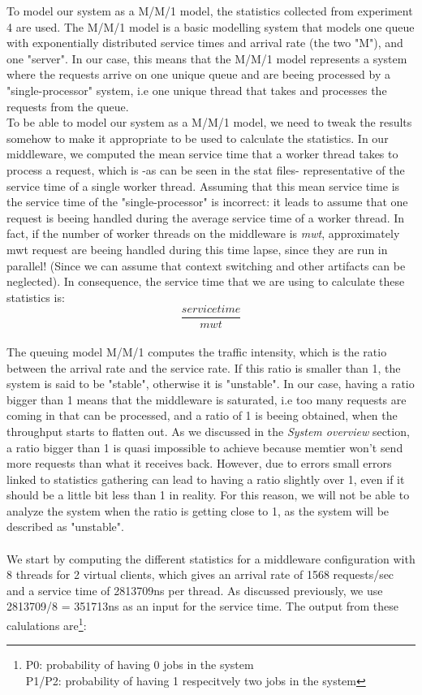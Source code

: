 \documentclass[11pt,a4paper]{article}
\begin{document}
To model our system as a M/M/1 model, the statistics collected from experiment 4 are used. 
The M/M/1 model is a basic modelling system that models one queue with exponentially distributed  service times and arrival rate (the two "M"), and one "server". In our case, this means that the M/M/1 model represents a system where the requests arrive on one unique queue and are beeing processed by a "single-processor" system, i.e one unique thread that takes and processes the requests from the queue.
\\
To be able to model our system as a M/M/1 model, we need to tweak the results somehow to make it appropriate to be used to calculate the statistics. In our middleware, we computed the mean service time that a worker thread takes to process a request, which is -as can be seen in the stat files- representative of the service time of a single worker thread. Assuming that this mean service time is the service time of the "single-processor" is incorrect: it leads to assume that one request is beeing handled during the average service time of a worker thread. In fact, if the number of worker threads on the middleware is \textit{mwt}, approximately {mwt} request are beeing handled during this time lapse, since they are run in parallel! (Since we can assume that context switching and other artifacts can be neglected). In consequence, the service time that we are using to calculate these statistics is: 
\[\frac{service time}{mwt}\]
\\
The queuing model M/M/1 computes the traffic intensity, which is the ratio between the arrival rate and the service rate. If this ratio is smaller than 1, the system is said to be "stable", otherwise it is "unstable". In our case, having a ratio bigger than 1 means that the middleware is saturated, i.e too many requests are coming in that can be processed, and a ratio of 1 is beeing obtained, when the throughput starts to flatten out. As we discussed in the \textit{System overview} section, a ratio bigger than 1 is quasi impossible to achieve because memtier won't send more requests than what it receives back. However, due to errors small errors linked to statistics gathering can lead to having a ratio slightly over 1, even if it should be a little bit less than 1 in reality. For this reason, we will not be able to analyze the system when the ratio is getting close to 1, as the system will be described as "unstable".
\\\\
We start by computing the different statistics for a middleware configuration with 8 threads for 2 virtual clients, which gives an arrival rate of 1568 requests/sec and a service time of 2813709ns per thread. As discussed previously, we use 2813709/8 = 351713ns as an input for the service time. The output from these calulations are\footnote{P0: probability of having 0 jobs in the system\\P1/P2: probability of having 1 respecitvely two jobs in the system}: 
\end{document}
